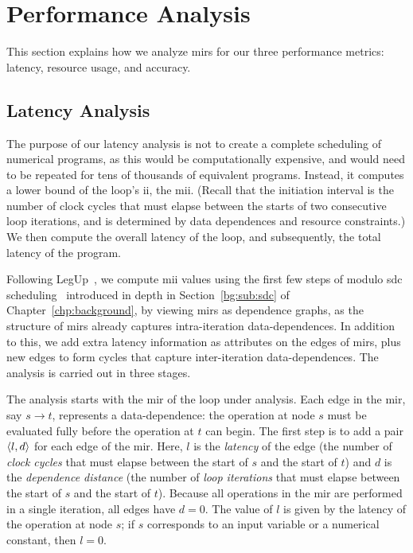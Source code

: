 \section{Performance Analysis}
\label{lo:sec:performance_analysis}

This section explains how we analyze \glspl{mir} for our three performance
metrics: latency, resource usage, and accuracy.

\subsection{Latency Analysis}
\label{lo:sub:latency}

The purpose of our latency analysis is not to create a complete scheduling
of numerical programs, as this would be computationally expensive, and would
need to be repeated for tens of thousands of equivalent programs.  Instead, it
computes a lower bound of the loop's \gls{ii}, the \acrfull{mii}.  (Recall that
the initiation interval is the number of clock cycles that must elapse between
the starts of two consecutive loop iterations, and is determined by data
dependences and resource constraints.)  We then compute the overall latency of
the loop, and subsequently, the total latency of the program.

Following LegUp~\cite{legup}, we compute \gls{mii} values using the first
few steps of modulo \gls{sdc} scheduling~\cite{canis14} introduced in depth
in Section~\ref{bg:sub:sdc} of Chapter~\ref{chp:background}, by viewing
\glspl{mir} as dependence graphs, as the structure of \glspl{mir} already
captures intra-iteration data-dependences.  In addition to this, we add extra
latency information as attributes on the edges of \glspl{mir}, plus new edges
to form cycles that capture inter-iteration data-dependences.  The analysis is
carried out in three stages.

The analysis starts with the \gls{mir} of the loop under analysis. Each edge
in the \gls{mir}, say $s\rightarrow t$, represents a data-dependence: the
operation at node $s$ must be evaluated fully before the operation at $t$
can begin.  The first step is to add a pair $\langle{l},{d}\rangle$ for each edge of
the \gls{mir}\@.  Here, $l$ is the \emph{latency} of the edge (the number of
\emph{clock cycles} that must elapse between the start of $s$ and the start
of $t$) and $d$ is the \emph{dependence distance} (the number of \emph{loop
iterations} that must elapse between the start of $s$ and the start of $t$).
Because all operations in the \gls{mir} are performed in a single iteration,
all edges have $d=0$.  The value of $l$ is given by the latency of the
operation at node $s$; if $s$ corresponds to an input variable or a numerical
constant, then $l=0$.

